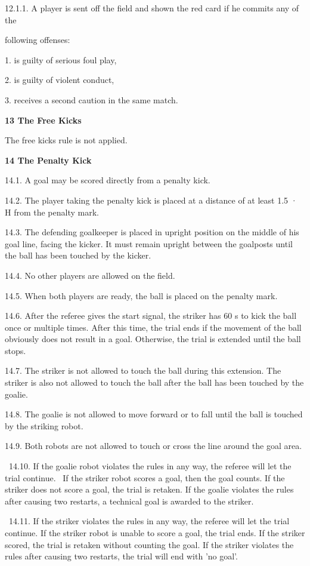\documentclass[a4paper]{article}
\begin{document}
12.1.1. A player is sent off the field and shown the red card if he commits any of the

following offenses:

1. is guilty of serious foul play, 

2. is guilty of violent conduct,

3. receives a second caution in the same match.


\bigskip

\textbf{13 The Free Kicks}

The free kicks rule is not applied.

\textbf{14 The Penalty Kick}

14.1. A goal may be scored directly from a penalty kick.

14.2. The player taking the penalty kick is placed at a distance of at least 1.5 \textgreek{· }H from the penalty mark.

14.3. The defending goalkeeper is placed in upright position on the middle of his goal line, facing the kicker. It must
remain upright between the goalposts until the ball has been touched by the kicker.

14.4. No other players are allowed on the field.

14.5. When both players are ready, the ball is placed on the penalty mark.

14.6. After the referee gives the start signal, the striker has 60 s to kick the ball once or multiple times. After this
time, the trial ends if the movement of the ball obviously does not result in a goal. Otherwise, the trial is extended
until the ball stops.

14.7. The striker is not allowed to touch the ball during this extension. The striker is also not allowed to touch the
ball after the ball has been touched by the goalie.

14.8. The goalie is not allowed to move forward or to fall until the ball is touched by the striking robot.

14.9. Both robots are not allowed to touch or cross the line around the goal area.

\ 14.10. If the goalie robot violates the rules in any way, the referee will let the trial continue. \ If the striker
robot scores a goal, then the goal counts. If the striker does not score a goal, the trial is retaken. If the goalie
violates the rules after causing two restarts, a technical goal is awarded to the striker.

\ 14.11. If the striker violates the rules in any way, the referee will let the trial continue. If the striker robot is
unable to score a goal, the trial ends. If the striker scored, the trial is retaken without counting the goal. If the
striker violates the rules after causing two restarts, the trial will end with 'no goal'.
\end{document}
